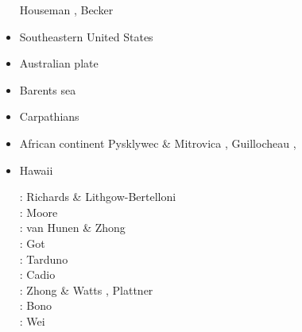 \begin{itemize}
\begin{scriptsize}
Houseman \etal \cite{honk00},
Becker \etal \cite{besb06}
\end{scriptsize}


\item{Southeastern United States}

\begin{scriptsize}
\cite{heps18}
\end{scriptsize}


\item Australian plate 
{\scriptsize
\cite{himu03}\cite{wemv03}\cite{pymi03}\cite{onml03}
\cite{onmj05}
\cite{hazs10}\cite{dimg10}
\cite{mahg11}\cite{digm11}
\cite{gosk14}
\cite{scsp15}
}
\item Barents sea 
{\scriptsize
\cite{buto07b}
\cite{gahs13}
\cite{gahs14}
}
\item Carpathians 
{\scriptsize
\cite{clbm04}
\cite{isms05}
\cite{nehe06}
\cite{sepg19}
}
\item African continent 
{\scriptsize
\cite{gikb94}
Pysklywec \& Mitrovica \cite{pymi99},
\cite{vabt11}
\cite{busm12}
\cite{gagb14}
\cite{wakc17}
Guillocheau \etal \cite{gusb18},
\cite{cels20}
}
\item Hawaii 

\begin{scriptsize}
\nineteenninetysix: Richards \& Lithgow-Bertelloni \cite{rili96}\\
\nineteenninetyeight: Moore \etal \cite{most98}\\
\twothousandthree: van Hunen \& Zhong \cite{vazh03}\\
\twothousandeight: Got \etal \cite{gomm08}\\
\twothousandnine: Tarduno \etal \cite{tabs09}\\
\twothousandtwelve: Cadio \etal \cite{cabp12}\\
\twothousandthirteen: Zhong \& Watts \cite{zhwa13}, Plattner \etal \cite{plab13}\\
\twothousandnineteen: Bono \etal \cite{botb19}\\
\twothousandtwenty: Wei \etal \cite{wesl20}
\end{scriptsize}


\end{itemize}

